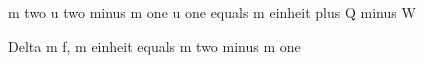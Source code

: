 m two u two minus m one u one equals m einheit plus Q minus W

Delta m f, m einheit equals m two minus m one